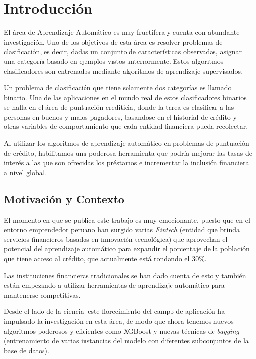 \chapter{Introducción}

El área de Aprendizaje Automático es muy fructífera y cuenta con abundante investigación. Uno de los objetivos de esta área es resolver problemas de clasificación, es decir, dadas un conjunto de características observadas, asignar una categoría basado en ejemplos vistos anteriormente. Estos algoritmos clasificadores son entrenados mediante algoritmos de aprendizaje supervisados.

Un problema de clasificación que tiene solamente dos categorías es llamado binario. Una de las aplicaciones en el mundo real de estos clasificadores binarios se halla en el área de puntuación crediticia, donde la tarea es clasificar a las personas en buenos y malos pagadores, basandose en el historial de crédito y otras variables de comportamiento que cada entidad financiera pueda recolectar.

Al utilizar los algoritmos de aprendizaje automático en problemas de puntuación de crédito, habilitamos una poderosa herramienta que podría mejorar las tasas de interés a las que son ofrecidas los préstamos e incrementar la inclusión financiera a nivel global.

\section{Motivación y Contexto}

El momento en que se publica este trabajo es muy emocionante, puesto que en el entorno emprendedor peruano han surgido varias \textit{Fintech} (entidad que brinda servicios financieros basados en innovación tecnológica) que aprovechan el potencial del aprendizaje automático para expandir el porcentaje de la población que tiene acceso al crédito, que actualmente está rondando el 30\%.

Las instituciones financieras tradicionales se han dado cuenta de esto y también están empezando a utilizar herramientas de aprendizaje automático para mantenerse competitivas.

Desde el lado de la ciencia, este florecimiento del campo de aplicación ha impulsado la investigación en esta área, de modo que ahora tenemos nuevos algoritmos poderosos y eficientes como \ac{XGBoost} \cite{Chen:2016:XST:2939672.2939785} y nuevas técnicas de \textit{bagging} (entrenamiento de varias instancias del modelo con diferentes subconjuntos de la base de datos).

